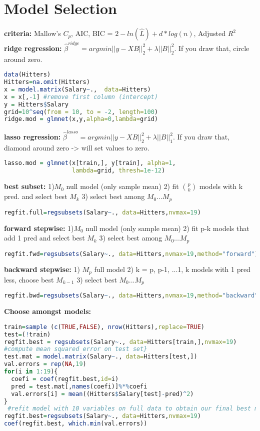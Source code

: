 \section{Model Selection}
\textbf{criteria: } Mallow's $C_p$, AIC, BIC = $2-ln(\hat L) + d*log(n)$, Adjusted $R^2$
\textbf{ridge regression: } $\hat\beta^{ridge} = argmin ||y-XB||_2^2+ \lambda||B||_2^2$. If you draw that, circle around zero. 
\begin{lstlisting}[language=R]
data(Hitters)
Hitters=na.omit(Hitters)
x = model.matrix(Salary~.,  data=Hitters)
x = x[,-1] #remove first column (intercept)
y = Hitters$Salary
grid=10^seq(from = 10, to = -2, length=100)
ridge.mod = glmnet(x,y,alpha=0,lambda=grid)
\end{lstlisting}
\textbf{lasso regression: }
$\hat\beta^{lasso} = argmin ||y-XB||_2^2+ \lambda||B||_1^2$. If you draw that, diamond around zero -> will set values to zero. 
\begin{lstlisting}[language=R]
lasso.mod = glmnet(x[train,], y[train], alpha=1, 
                   lambda=grid, thresh=1e-12)
\end{lstlisting}
\textbf{best subset: }
1)$M_0$ null model (only sample mean)
2) fit $p \choose k$ models with k pred. and select best $M_k$
3) select best among $M_0 ... M_p$
\begin{lstlisting}[language=R]
regfit.full=regsubsets(Salary~., data=Hitters,nvmax=19)
\end{lstlisting}

\textbf{forward stepwise: }
1)$M_0$ null model (only sample mean)
2) fit p-k models that add 1 pred and select best $M_k$
3) select best among $M_0 ... M_p$
\begin{lstlisting}[language=R]
regfit.fwd=regsubsets(Salary~., data=Hitters,nvmax=19,method="forward")
\end{lstlisting}
\textbf{backward stepwise: }
1) $M_p$ full model
2) k = p, p-1, ...1,
k models with 1 pred less, choose best $M_{k-1}$
3) select best $M_0 ... M_p$
\begin{lstlisting}[language=R]
regfit.bwd=regsubsets(Salary~., data=Hitters,nvmax=19,method="backward")
\end{lstlisting}
\textbf{Choose amongst models: }
\begin{lstlisting}[language=R]
train=sample (c(TRUE,FALSE), nrow(Hitters),replace=TRUE)
test=(!train)
regfit.best = regsubsets(Salary~., data=Hitters[train,],nvmax=19)
#compute mean squared error on test set}
test.mat = model.matrix(Salary~., data=Hitters[test,])
val.errors = rep(NA,19)
for(i in 1:19){
  coefi = coef(regfit.best,id=i)
  pred = test.mat[,names(coefi)]%*%coefi
  val.errors[i] = mean((Hitters$Salary[test]-pred)^2)
}
 #refit model with 10 variables on full data to obtain our final best model
regfit.best=regsubsets(Salary~., data=Hitters,nvmax=19)
coef(regfit.best, which.min(val.errors))
\end{lstlisting}
